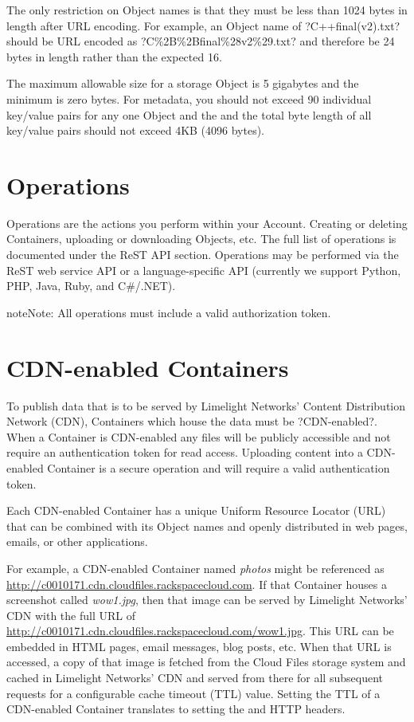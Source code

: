 \documentclass[letterpaper,10pt,english]{manual}
\begin{document}
The only restriction on Object names is that they must be less than 1024
bytes in length after URL encoding.  For example, an Object name of
?C++final(v2).txt? should be URL encoded as ?C\%2B\%2Bfinal\%28v2\%29.txt?
and therefore be 24 bytes in length rather than the expected 16.

The maximum allowable size for a storage Object is 5 gigabytes and the
minimum is zero bytes.  For metadata, you should not exceed 90 individual
key/value pairs for any one Object and the and the total byte length of
all key/value pairs should not exceed 4KB (4096 bytes).


\section{Operations}

Operations are the actions you perform within your Account. Creating or
deleting Containers, uploading or downloading Objects, etc. The full list
of operations is documented under the ReST API section. Operations may be
performed via the ReST web service API or a language-specific API
(currently we support Python, PHP, Java, Ruby, and C\#/.NET).

\begin{notice}{note}{Note:}
All operations must include a valid authorization token.
\end{notice}


\section{CDN-enabled Containers}

To publish data that is to be served by Limelight Networks' Content
Distribution Network (CDN), Containers which house the data must be
?CDN-enabled?.  When a Container is CDN-enabled any files will be
publicly accessible and not require an authentication token for read
access.  Uploading content into a CDN-enabled Container is a secure
operation and will require a valid authentication token.

Each CDN-enabled Container has a unique Uniform Resource Locator (URL)
that can be combined with its Object names and openly distributed in web
pages, emails, or other applications.

For example, a CDN-enabled Container named \emph{photos} might be referenced as
\href{http://c0010171.cdn.cloudfiles.rackspacecloud.com}{http://c0010171.cdn.cloudfiles.rackspacecloud.com}.  If that Container
houses a screenshot called \emph{wow1.jpg}, then that image can be served by
Limelight Networks' CDN with the full URL of
\href{http://c0010171.cdn.cloudfiles.rackspacecloud.com/wow1.jpg}{http://c0010171.cdn.cloudfiles.rackspacecloud.com/wow1.jpg}.  This URL can
be embedded in HTML pages, email messages, blog posts, etc.  When that URL
is accessed, a copy of that image is fetched from the Cloud Files storage
system and cached in Limelight Networks' CDN and served from there for
all subsequent requests for a configurable cache timeout (TTL) value.
Setting the TTL of a CDN-enabled Container translates to setting the
 and  HTTP headers.
\end{document}

